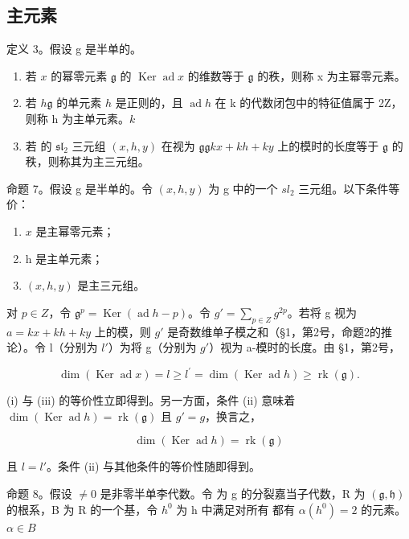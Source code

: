 \subsection{主元素}

定义 3。假设 g 是半单的。

\begin{enumerate}
\def\labelenumi{(\roman{enumi})}
\item
  若 \(x\) 的幂零元素 \(\mathfrak{g}\) 的 \(\operatorname{Ker} \operatorname{ad} x\) 的维数等于 \(\mathfrak{g}\) 的秩，则称 x 为主幂零元素。
\item
  若 \(h\)\(\mathfrak{g}\) 的单元素 \(h\) 是正则的，且 \(\operatorname{ad} h\) 在 k 的代数闭包中的特征值属于 2Z，则称 h 为主单元素。\(k\)
\item
  若  的 \(\mathfrak{sl}_2\) 三元组 \((x,h,y)\) 在视为 \(\mathfrak{g}\)\(\mathfrak{g}\)\(kx + kh + ky\) 上的模时的长度等于 \(\mathfrak{g}\) 的秩，则称其为主三元组。
\end{enumerate}

命题 7。假设 g 是半单的。令 \((x,h,y)\) 为 g 中的一个 \(sl_{2}\) 三元组。以下条件等价：

\begin{enumerate}
\def\labelenumi{(\roman{enumi})}
\item
  \(x\) 是主幂零元素；
\item
  h 是主单元素；
\item
  \((x,h,y)\) 是主三元组。
\end{enumerate}

对 \(p \in Z\)，令 \(\mathfrak{g}^{p} = \operatorname{Ker}(\operatorname{ad} h - p)\)。令 \(g' = \sum_{p \in Z} g^{2p}\)。若将 g 视为 \(a = kx + kh + ky\) 上的模，则 \(g'\) 是奇数维单子模之和（§1，第2号，命题2的推论）。令 l（分别为 \(l'\)）为将 g（分别为 \(g'\)）视为 a-模时的长度。由 §1，第2号，

\[
\dim (\operatorname{Ker} \operatorname{ad} x) = l \geq l ^ {\prime} = \dim (\operatorname{Ker} \operatorname{ad} h) \geq \operatorname{rk} (\mathfrak {g}).
\]

(i) 与 (iii) 的等价性立即得到。另一方面，条件 (ii) 意味着 \(\dim(\operatorname{Ker} \operatorname{ad} h) = \operatorname{rk}(\mathfrak{g})\) 且 \(g' = g\)，换言之，

\[
\dim (\operatorname{Ker} \operatorname{ad} h) = \operatorname{rk} (\mathfrak {g})
\]

且 \(l = l'\)。条件 (ii) 与其他条件的等价性随即得到。

命题 8。假设 \(\neq 0\) 是非零半单李代数。令  为 g 的分裂嘉当子代数，R 为 \((\mathfrak{g},\mathfrak{h})\) 的根系，B 为 R 的一个基，令 \(h^{0}\) 为 h 中满足对所有  都有 \(\alpha(h^{0}) = 2\) 的元素。\(\alpha \in B\)

